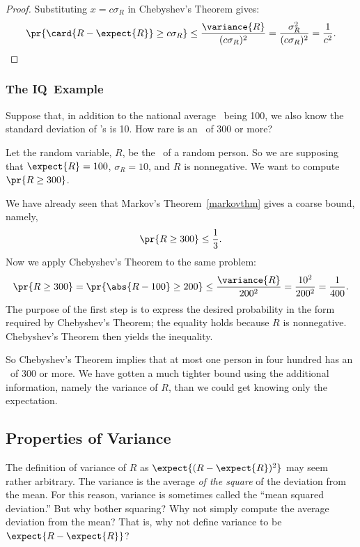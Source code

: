 \begin{proof}
  Substituting $x = c \sigma_R$ in Chebyshev's Theorem gives:
  \begin{displaymath}
    \pr{\card{R - \expect{R}} \geq c \sigma_R}
    \leq
    \frac{\variance{R}}{(c \sigma_R)^2}
    =  \frac{\sigma_R^2}{(c \sigma_R)^2}
    = \frac{1}{c^2}.
  \end{displaymath}

\end{proof}

\subsubsection{The IQ\ Example}\label{IQsec}

Suppose that, in addition to the national average \IQ\ being 100, we also
know the standard deviation of \IQ's is 10.  How rare is an \IQ\ of 300 or
more?

Let the random variable, $R$, be the \IQ\ of a random person.  So we are
supposing that $\expect{R} = 100$, $\sigma_R = 10$, and $R$ is
nonnegative.  We want to compute $\pr{R \geq 300}$.

We have already seen that Markov's Theorem~\ref{markovthm} gives a coarse
bound, namely,
\[
  \pr{R \geq 300} \leq \frac{1}{3}.
\]
Now we apply Chebyshev's Theorem to the same problem:
\[
\pr{R \geq 300} = \pr{\abs{R - 100} \geq 200} \leq
\frac{\variance{R}}{200^2} = \frac{10^2}{200^2} = \frac{1}{400}.
\]
The purpose of the first step is to express the desired probability in the
form required by Chebyshev's Theorem; the equality holds because $R$ is
nonnegative.  Chebyshev's Theorem then yields the inequality.

So Chebyshev's Theorem implies that at most one person in four hundred has
an \IQ\ of 300 or more.  We have gotten a much tighter bound using the
additional information, namely the variance of $R$, than we could get
knowing only the expectation.

\subsection{Properties of Variance}

The definition of variance of $R$ as $\expect{(R - \expect{R})^2}$ may
seem rather arbitrary.
\iffalse
The variance is the average \emph{of the square} of the deviation from the
mean.  For this reason, variance is sometimes called the ``mean squared
deviation.''  But why bother squaring?  Why not simply compute the average
deviation from the mean?  That is, why not define variance to be
$\expect{R - \expect{R}}$?

